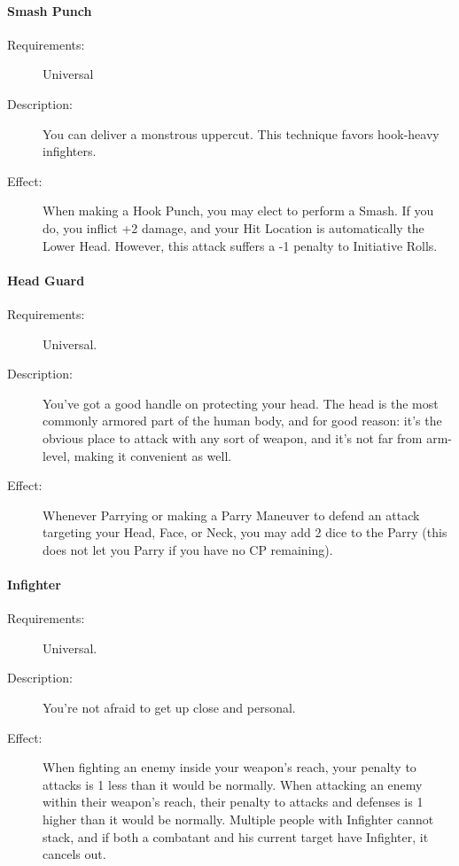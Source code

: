 \documentclass[oneside,11pt,english]{book}
\begin{document}
\paragraph{Smash Punch}\label{talent:Smash Punch}
\begin{description}
\item [Requirements:] Universal 
\item [Description:] You can deliver a monstrous uppercut. This technique favors hook-heavy infighters. 
\item [Effect:] When making a Hook Punch, you may elect to perform a Smash. If you do, you inflict +2 
  damage, and your Hit Location is automatically the Lower Head. However, this attack suffers a -1 penalty 
  to Initiative Rolls. 
\end{description}
\paragraph{Head Guard}\label{talent:Head Guard}
\begin{description}
\item [Requirements:] Universal. 
\item [Description:] You’ve got a good handle on protecting your head. The head is the most commonly 
  armored part of the human body, and for good reason: it’s the obvious place to attack with any sort of 
  weapon, and it’s not far from arm-level, making it convenient as well. 
\item [Effect:] Whenever Parrying or making a Parry Maneuver to defend an attack targeting your Head, Face, or 
  Neck, you may add 2 dice to the Parry (this does not let you Parry if you have no CP remaining). 
  
\end{description}
\paragraph{Infighter}\label{talent:Infighter}
\begin{description}
\item [Requirements:] Universal. 
\item [Description:] You’re not afraid to get up close and personal. 
\item [Effect:] When fighting an enemy inside your weapon's reach, your penalty to attacks is 1 less than it would be normally. When attacking an enemy within their weapon’s reach, their penalty to attacks and 
  defenses is 1 higher than it would be normally. Multiple people with Infighter cannot stack, and if both a 
  combatant and his current target have Infighter, it cancels out. 
  
\end{description}
\end{document}
